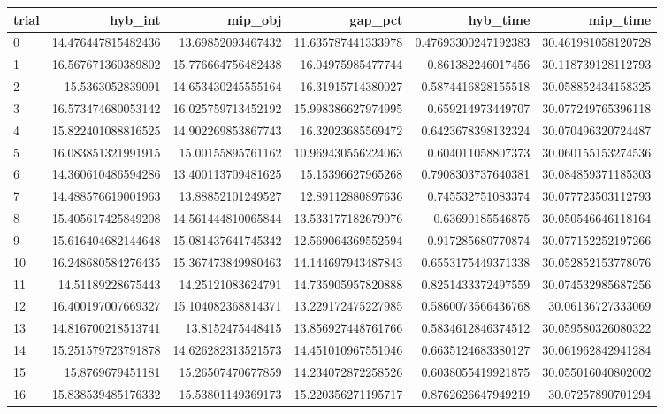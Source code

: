 \begin{tabular}{lrrrrr}
\hline
trial & hyb_int & mip_obj & gap_pct & hyb_time & mip_time \\ \hline
0 & 14.476447815482436 & 13.69852093467432 & 11.635787441333978 & 0.47693300247192383 & 30.461981058120728 \\
1 & 16.567671360389802 & 15.776664756482438 & 16.04975985477744 & 0.861382246017456 & 30.118739128112793 \\
2 & 15.5363052839091 & 14.653430245555164 & 16.31915714380027 & 0.5874416828155518 & 30.058852434158325 \\
3 & 16.573474680053142 & 16.025759713452192 & 15.998386627974995 & 0.659214973449707 & 30.077249765396118 \\
4 & 15.822401088816525 & 14.902269853867743 & 16.32023685569472 & 0.6423678398132324 & 30.070496320724487 \\
5 & 16.083851321991915 & 15.00155895761162 & 10.969430556224063 & 0.604011058807373 & 30.060155153274536 \\
6 & 14.360610486594286 & 13.400113709481625 & 15.15396627965268 & 0.7908303737640381 & 30.084859371185303 \\
7 & 14.488576619001963 & 13.88852101249527 & 12.89112880897636 & 0.745532751083374 & 30.077723503112793 \\
8 & 15.405617425849208 & 14.561444810065844 & 13.533177182679076 & 0.63690185546875 & 30.050546646118164 \\
9 & 15.616404682144648 & 15.081437641745342 & 12.569064369552594 & 0.917285680770874 & 30.077152252197266 \\
10 & 16.248680584276435 & 15.367473849980463 & 14.144697943487843 & 0.6553175449371338 & 30.052852153778076 \\
11 & 14.51189228675443 & 14.25121083624791 & 14.735905957820888 & 0.8251433372497559 & 30.074532985687256 \\
12 & 16.400197007669327 & 15.104082368814371 & 13.229172475227985 & 0.5860073566436768 & 30.06136727333069 \\
13 & 14.816700218513741 & 13.8152475448415 & 13.856927448761766 & 0.5834612846374512 & 30.059580326080322 \\
14 & 15.251579723791878 & 14.626282313521573 & 14.451010967551046 & 0.6635124683380127 & 30.061962842941284 \\
15 & 15.8769679451181 & 15.26507470677859 & 14.234072872258526 & 0.6038055419921875 & 30.055016040802002 \\
16 & 15.838539485176332 & 15.53801149369173 & 15.220356271195717 & 0.8762626647949219 & 30.07257890701294 \\

\end{tabular}
